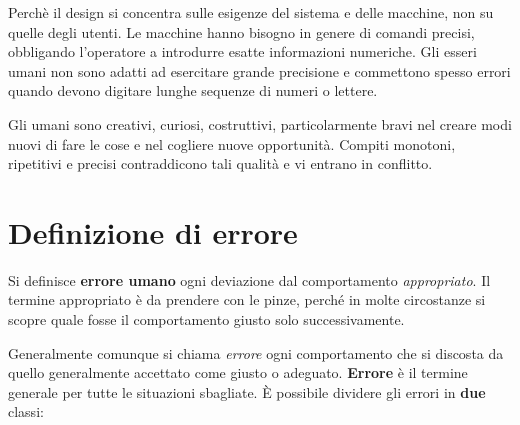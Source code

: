 \documentclass[a4paper,11pt,oneside]{book}
\begin{document}
Perchè il design si concentra sulle esigenze del sistema
e delle macchine, non su quelle degli utenti. Le macchine hanno bisogno in genere di
comandi precisi, obbligando l'operatore a introdurre esatte informazioni numeriche. Gli esseri umani non sono adatti ad esercitare grande precisione e commettono spesso
errori quando devono digitare lunghe sequenze di numeri o lettere.

Gli umani sono creativi, curiosi, costruttivi, particolarmente bravi nel creare modi nuovi di fare le cose e nel cogliere nuove opportunità. Compiti monotoni, ripetitivi e precisi contraddicono tali qualità e vi entrano in conflitto.

\section{Definizione di errore}
Si definisce \textbf{errore umano} ogni deviazione dal comportamento \textit{appropriato}. Il termine appropriato è da prendere con le pinze, perché in molte circostanze si scopre quale fosse il comportamento giusto solo successivamente.

Generalmente comunque si chiama \textit{errore} ogni comportamento che si discosta da quello generalmente accettato come giusto o adeguato. \textbf{Errore} è il termine generale per tutte le situazioni sbagliate. È possibile dividere gli errori in \textbf{due} classi:
\end{document}
